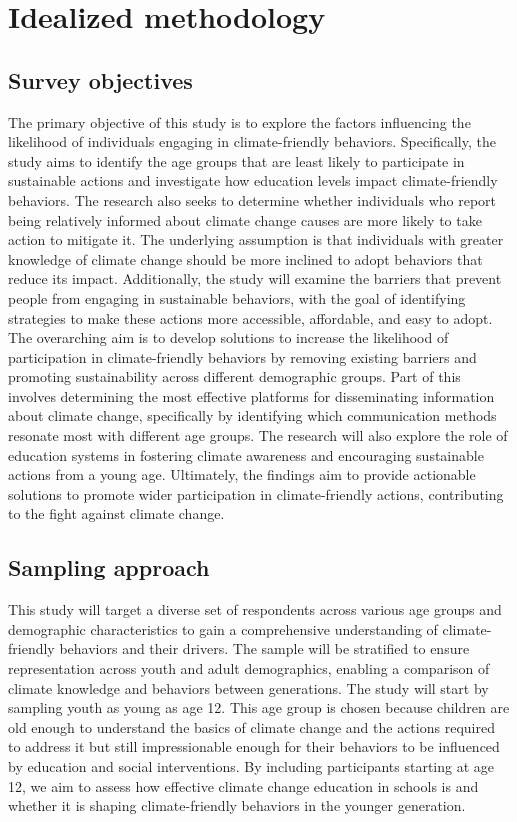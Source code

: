 \documentclass[
  letterpaper,
  DIV=11,
  numbers=noendperiod]{scrartcl}
\begin{document}
\section{Idealized methodology}\label{sec-idealized-meth}

\subsection{Survey objectives}\label{survey-objectives}

The primary objective of this study is to explore the factors
influencing the likelihood of individuals engaging in climate-friendly
behaviors. Specifically, the study aims to identify the age groups that
are least likely to participate in sustainable actions and investigate
how education levels impact climate-friendly behaviors. The research
also seeks to determine whether individuals who report being relatively
informed about climate change causes are more likely to take action to
mitigate it. The underlying assumption is that individuals with greater
knowledge of climate change should be more inclined to adopt behaviors
that reduce its impact. Additionally, the study will examine the
barriers that prevent people from engaging in sustainable behaviors,
with the goal of identifying strategies to make these actions more
accessible, affordable, and easy to adopt. The overarching aim is to
develop solutions to increase the likelihood of participation in
climate-friendly behaviors by removing existing barriers and promoting
sustainability across different demographic groups. Part of this
involves determining the most effective platforms for disseminating
information about climate change, specifically by identifying which
communication methods resonate most with different age groups. The
research will also explore the role of education systems in fostering
climate awareness and encouraging sustainable actions from a young age.
Ultimately, the findings aim to provide actionable solutions to promote
wider participation in climate-friendly actions, contributing to the
fight against climate change.

\subsection{Sampling approach}\label{sampling-approach}

This study will target a diverse set of respondents across various age
groups and demographic characteristics to gain a comprehensive
understanding of climate-friendly behaviors and their drivers. The
sample will be stratified to ensure representation across youth and
adult demographics, enabling a comparison of climate knowledge and
behaviors between generations. The study will start by sampling youth as
young as age 12. This age group is chosen because children are old
enough to understand the basics of climate change and the actions
required to address it but still impressionable enough for their
behaviors to be influenced by education and social interventions. By
including participants starting at age 12, we aim to assess how
effective climate change education in schools is and whether it is
shaping climate-friendly behaviors in the younger generation.
\end{document}
